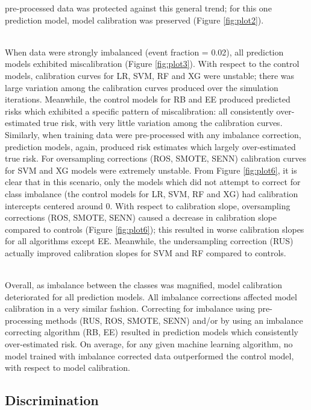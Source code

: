 \documentclass[AMA,STIX1COL,]{WileyNJD-v2}
\begin{document}
pre-processed data was protected against this general trend; for this
one prediction model, model calibration was preserved (Figure
\ref{fig:plot2}).\\
\strut \\
When data were strongly imbalanced (event fraction = 0.02), all
prediction models exhibited miscalibration (Figure \ref{fig:plot3}).
With respect to the control models, calibration curves for LR, SVM, RF
and XG were unstable; there was large variation among the calibration
curves produced over the simulation iterations. Meanwhile, the control
models for RB and EE produced predicted risks which exhibited a specific
pattern of miscalibration: all consistently over-estimated true risk,
with very little variation among the calibration curves. Similarly, when
training data were pre-processed with any imbalance correction,
prediction models, again, produced risk estimates which largely
over-estimated true risk. For oversampling corrections (ROS, SMOTE,
SENN) calibration curves for SVM and XG models were extremely unstable.
From Figure \ref{fig:plot6}, it is clear that in this scenario, only the
models which did not attempt to correct for class imbalance (the control
models for LR, SVM, RF and XG) had calibration intercepts centered
around 0. With respect to calibration slope, oversampling corrections
(ROS, SMOTE, SENN) caused a decrease in calibration slope compared to
controls (Figure \ref{fig:plot6}); this resulted in worse calibration
slopes for all algorithms except EE. Meanwhile, the undersampling
correction (RUS) actually improved calibration slopes for SVM and RF
compared to controls.\\
\strut \\
Overall, as imbalance between the classes was magnified, model
calibration deteriorated for all prediction models. All imbalance
corrections affected model calibration in a very similar fashion.
Correcting for imbalance using pre-processing methods (RUS, ROS, SMOTE,
SENN) and/or by using an imbalance correcting algorithm (RB, EE)
resulted in prediction models which consistently over-estimated risk. On
average, for any given machine learning algorithm, no model trained with
imbalance corrected data outperformed the control model, with respect to
model calibration.

\hypertarget{discrimination}{%
\subsection{Discrimination}\label{discrimination}}
\end{document}
